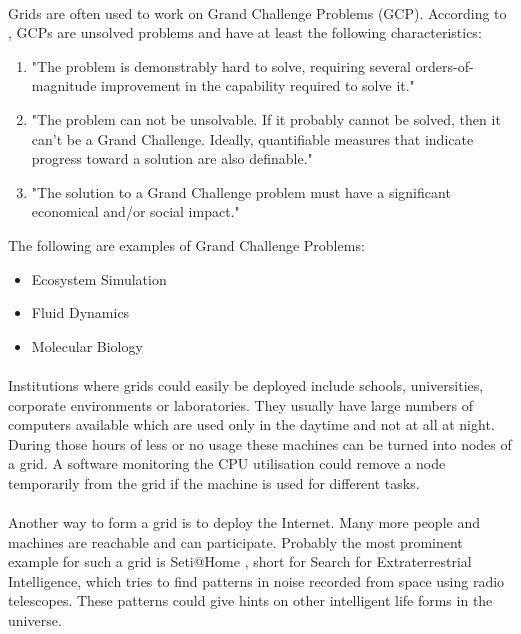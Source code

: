 \paragraph{}
Grids are often used to work on Grand Challenge Problems (GCP). According to , GCPs are unsolved problems and have at least the following characteristics:
\begin{enumerate}
\item "The problem is demonstrably hard to solve, requiring several orders-of-magnitude improvement in the capability required to solve it."
\item "The problem can not be unsolvable. If it probably cannot be solved, then it can't be a Grand Challenge. Ideally, quantifiable measures that indicate progress toward a solution are also definable."
\item "The solution to a Grand Challenge problem must have a significant economical and/or social impact."
\end{enumerate}
The following are examples of Grand Challenge Problems:
\begin{itemize}
\item Ecosystem Simulation
\item Fluid Dynamics
\item Molecular Biology
\end{itemize}

\paragraph{}
Institutions where grids could easily be deployed include schools, universities, corporate environments or laboratories. They usually have large numbers of computers available which are used only in the daytime and not at all at night. During those hours of less or no usage these machines can be turned into nodes of a grid. A software monitoring the CPU utilisation could remove a node temporarily from the grid if the machine is used for different tasks.

\paragraph{}
Another way to form a grid is to deploy the Internet. Many more people and machines are reachable and can participate. Probably the most prominent example for such a grid is Seti@Home , short for Search for Extraterrestrial Intelligence, which tries to find patterns in noise recorded from space using radio telescopes. These patterns could give hints on other intelligent life forms in the universe.


